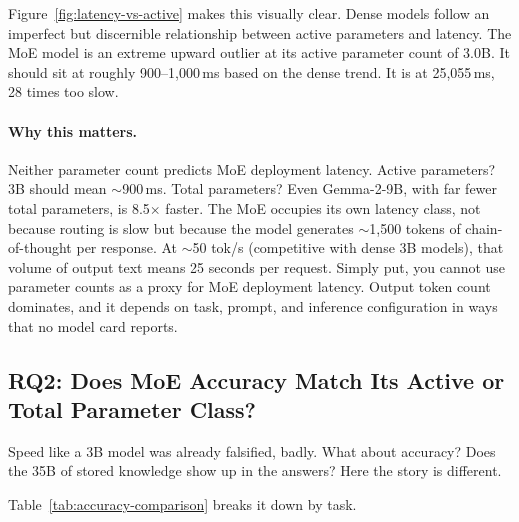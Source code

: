 \documentclass[11pt]{article}
\begin{document}
Figure~\ref{fig:latency-vs-active} makes this visually clear.  Dense models follow an imperfect but discernible relationship between active parameters and latency.  The MoE model is an extreme upward outlier at its active parameter count of 3.0B.  It should sit at roughly 900--1,000\,ms based on the dense trend.  It is at 25,055\,ms, 28 times too slow.

\paragraph{Why this matters.}
Neither parameter count predicts MoE deployment latency.  Active parameters? 3B should mean ${\sim}$900\,ms.  Total parameters? Even Gemma-2-9B, with far fewer total parameters, is 8.5$\times$ faster.  The MoE occupies its own latency class, not because routing is slow but because the model generates ${\sim}$1,500 tokens of chain-of-thought per response.  At ${\sim}$50 tok/s (competitive with dense 3B models), that volume of output text means 25 seconds per request.  Simply put, you cannot use parameter counts as a proxy for MoE deployment latency.  Output token count dominates, and it depends on task, prompt, and inference configuration in ways that no model card reports.

\subsection{RQ2: Does MoE Accuracy Match Its Active or Total Parameter Class?}
\label{sec:rq2-accuracy}

Speed like a 3B model was already falsified, badly.  What about accuracy? Does the 35B of stored knowledge show up in the answers? Here the story is different.

Table~\ref{tab:accuracy-comparison} breaks it down by task.
\end{document}
